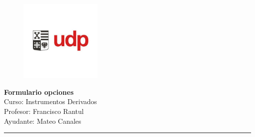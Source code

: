 \documentclass[12pt]{article}
\begin{document}
\begin{figure}
    \vspace{-5em}    
    \flushright
    \includegraphics[height=4cm]{../imagenes/logo.png}\\[-3em]
\end{figure}
\begin{center}
    {\LARGE \textbf{Formulario opciones}}\\[0.5em]
    Curso: Instrumentos Derivados\\
    Profesor: Francisco Rantul\\
    Ayudante: Mateo Canales\\
\end{center}
\vspace{1pt}
{\color{rojoudp}\hrule height 2pt}
\vspace{10pt}

\newcommand{\arbol}{$p = \frac{e^{r\cdot \Delta t}-d}{u-d}$}
\newcommand{\neutral}{$f = e^{-r \cdot \Delta t}\cdot (p \cdot f_u+(1-p) \cdot f_d)$}
\newcommand{\putcall}{$S_0+p = K \cdot e^{-r \cdot T}+c$}
\newcommand{\ceroud}{$S_0u|d=S_0*(1+(subida|bajada)) $}
\newcommand{\neutrali}{$S_0d\cdot \Delta-f_d=S_0u\cdot \Delta-f_u$}
\newcommand{\portafolio}{$S_0\cdot \Delta-f=(S_0u\cdot \Delta-f_u) \cdot e^{-rT}$}
\newcommand{\calcud}{$u|d=\frac{S_0u|d}{S_0}$}
\newcommand{\callbsm}{$c =  S_0 \cdot \mathcal{N}(d_1)- K \cdot e^{-r \cdot (T)} \cdot \mathcal{N}(d_2) $}
\newcommand{\putbsm}{$p = K \cdot e^{-r \cdot (T)} \cdot \mathcal{N}(-d_2) - S_0 \cdot \mathcal{N}(-d_1)$}
\newcommand{\enemenosuno}{$\mathcal{N}(-d)=1-\mathcal{N}(d)$}
\newcommand{\Duno }{$  d_1 = \frac{\ln(S_0 / K) + \left( r + \frac{\sigma^2}{2} \right) \cdot T}{\sigma \cdot \sqrt{T}}$}
\newcommand{\Ddos}{$d_2 = d_1 - \sigma \cdot \sqrt{T}$}
\newcommand{\dividendo}{$S_1 = S_0 - e^{-r \cdot t} \cdot div $}
\newcommand{\vp}{$vp =e^{-r \cdot t} \cdot valor futuro $}
\newcommand{\browniano}{$\ln (S_T) \sim \mathcal{N}\left(\ln (S_0) + (\mu - \sigma^2/2)\cdot T,\ \sigma^2 \cdot T\right)$ }
\newcommand{\media}{$\mathbb{E}(S_T) = S_0 \cdot e^{\mu \cdot T}$}
\newcommand{\varianza}{$\mathrm{var}(S_T) = S_0^2 \cdot e^{2\cdot \mu \cdot T} \cdot \left( e^{\sigma^2\cdot T} - 1 \right)$}
\newcommand{\standarizar}{$Z = \frac{\ln K - \mathbb{E}[\ln S_T]}{\text{desv.\ estándar}}$}
\newcommand{\intervaloconf}{$IC = \left[ \mathbb{E}(S_T) - Z_{\alpha/2} \cdot \mathrm{sd}{S_T},\ \mathbb{E}(S_T) + Z_{\alpha/2} \cdot \mathrm{sd}(S_T)\right]$}
\newcommand{\ito}{\[df = \left( \frac{\partial f}{\partial t} + \mu \frac{\partial f}{\partial x} + \frac{1}{2} \sigma^2 \frac{\partial^2 f}{\partial x^2} \right) dt + \sigma \frac{\partial f}{\partial x} dz\]
}
\end{document}
